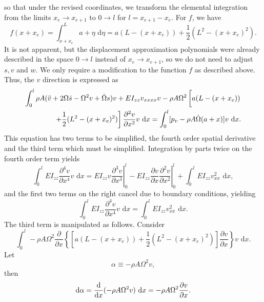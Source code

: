 so that under the revised coordinates, we transform the elemental integration from the limits $x_e\rightarrow x_{e+1}$ to $0\rightarrow l$ for $l = x_{e+1}-x_e$. For $f$, we have
\begin{equation}
f(x+x_e) = \int_{x+x_e}^L a+\eta \text{ d}\eta = a(L-(x+x_e))+\frac{1}{2}(L^2-(x+x_e)^2).
\end{equation}
It is not apparent, but the displacement approximation polynomials were already described in the space $0\rightarrow l$ instead of $x_e\rightarrow x_{e+1}$, so we do not need to adjust $s,v$ and $w$. We only require a modification to the function $f$ as described above. Thus, the $v$ direction is expressed as
\begin{eqnarray}
\int_0^l\rho A(\ddot v + 2\Omega\dot s-\Omega^2v+\dot\Omega s)v+EI_{zz}v_{xxxx}v-\rho A\Omega^2\left[a(L-(x+x_e))\vphantom{\frac{0}{0}}\right.\\
\left.+\frac{1}{2}(L^2-(x+x_e)^2)\right]\frac{\partial^2 v}{\partial x^2} v\text{ d}x = \int_0^l[p_v - \rho A\dot\Omega(a+x)]v\text{ d}x. \nonumber
\end{eqnarray}
This equation has two terms to be simplified, the fourth order spatial derivative and the third term which must be simplified. Integration by parts twice on the fourth order term yields
\begin{equation}
\int_0^lEI_{zz}\frac{\partial^4 v}{\partial x^4}v\text{ d}x = \left.EI_{zz}v\frac{\partial^3 v}{\partial x^3}\right|_0^l-\left.EI_{zz}\frac{\partial v}{\partial x}\frac{\partial^2 v}{\partial x^2}\right|_0^l + \int_0^lEI_{zz}v_{xx}^2\text{ d}x,
\label{eq:v.disc.int.by.parts.1}
\end{equation}
and the first two terms on the right cancel due to boundary conditions, yielding
\begin{equation}
\int_0^lEI_{zz}\frac{\partial^4 v}{\partial x^4}v\text{ d}x =  \int_0^lEI_{zz}v_{xx}^2\text{ d}x.
\end{equation}
The third term is manipulated as follows. Consider
\begin{equation}
\int_0^l-\rho A\Omega^2\frac{\partial}{\partial x}\left\lbrace \left[a(L-(x+x_e))+\frac{1}{2}(L^2-(x+x_e)^2)\right]\frac{\partial v}{\partial x}\right\rbrace v\text{ d}x.
\end{equation}
Let
\begin{equation}
\alpha \equiv -\rho A\Omega^2v,
\end{equation}
then
\begin{equation}
\text d\alpha = \frac{\text d}{\text dx}(-\rho A\Omega^2v)\text{ d}x = -\rho A\Omega^2\frac{\partial v}{\partial x}.
\end{equation}
